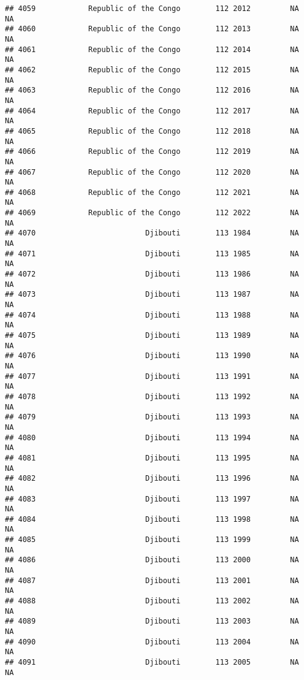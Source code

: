 \documentclass[
]{article}
\begin{document}
\begin{verbatim}
## 4059            Republic of the Congo        112 2012         NA         NA
## 4060            Republic of the Congo        112 2013         NA         NA
## 4061            Republic of the Congo        112 2014         NA         NA
## 4062            Republic of the Congo        112 2015         NA         NA
## 4063            Republic of the Congo        112 2016         NA         NA
## 4064            Republic of the Congo        112 2017         NA         NA
## 4065            Republic of the Congo        112 2018         NA         NA
## 4066            Republic of the Congo        112 2019         NA         NA
## 4067            Republic of the Congo        112 2020         NA         NA
## 4068            Republic of the Congo        112 2021         NA         NA
## 4069            Republic of the Congo        112 2022         NA         NA
## 4070                         Djibouti        113 1984         NA         NA
## 4071                         Djibouti        113 1985         NA         NA
## 4072                         Djibouti        113 1986         NA         NA
## 4073                         Djibouti        113 1987         NA         NA
## 4074                         Djibouti        113 1988         NA         NA
## 4075                         Djibouti        113 1989         NA         NA
## 4076                         Djibouti        113 1990         NA         NA
## 4077                         Djibouti        113 1991         NA         NA
## 4078                         Djibouti        113 1992         NA         NA
## 4079                         Djibouti        113 1993         NA         NA
## 4080                         Djibouti        113 1994         NA         NA
## 4081                         Djibouti        113 1995         NA         NA
## 4082                         Djibouti        113 1996         NA         NA
## 4083                         Djibouti        113 1997         NA         NA
## 4084                         Djibouti        113 1998         NA         NA
## 4085                         Djibouti        113 1999         NA         NA
## 4086                         Djibouti        113 2000         NA         NA
## 4087                         Djibouti        113 2001         NA         NA
## 4088                         Djibouti        113 2002         NA         NA
## 4089                         Djibouti        113 2003         NA         NA
## 4090                         Djibouti        113 2004         NA         NA
## 4091                         Djibouti        113 2005         NA         NA

\end{verbatim}
\end{document}
